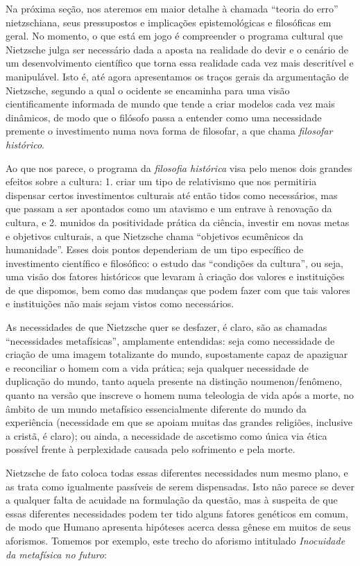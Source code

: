 \documentclass[
	12pt,				%
	openright,			%
	oneside,			%
	a4paper,			%
	english,			%
	french,				%
	spanish,			%
	brazil				%
	]{abntex2}
\begin{document}
	Na próxima seção, nos ateremos em maior detalhe à chamada “teoria do erro” nietzschiana, seus pressupostos e implicações epistemológicas e filosóficas em geral. No momento, o que está em jogo é compreender o programa cultural que Nietzsche julga ser necessário dada a aposta na realidade do devir e o cenário de um desenvolvimento científico que torna essa realidade cada vez mais descritível e manipulável. Isto é, até agora apresentamos os traços gerais da argumentação de Nietzsche, segundo a qual o ocidente se encaminha para uma visão cientificamente informada de mundo que tende a criar modelos cada vez mais dinâmicos, de modo que o filósofo passa a entender como uma necessidade premente o investimento numa nova forma de filosofar, a que chama \textit{filosofar histórico}.
	
	Ao que nos parece, o programa da \textit{filosofia histórica} visa pelo menos dois grandes efeitos sobre a cultura: 1. criar um tipo de relativismo que nos permitiria dispensar certos investimentos culturais até então tidos como necessários, mas que passam a ser apontados como um atavismo e um entrave à renovação da cultura, e 2. munidos da positividade prática da ciência, investir em novas metas e objetivos culturais, a que Nietzsche chama “objetivos ecumênicos da humanidade”. Esses dois pontos dependeriam de um tipo específico de investimento científico e filosófico: o estudo das “condições da cultura”, ou seja, uma visão dos fatores históricos que levaram à criação dos valores e instituições de que dispomos, bem como das mudanças que podem fazer com que tais valores e instituições não mais sejam vistos como necessários. 

As necessidades de que Nietzsche quer se desfazer, é claro, são as chamadas “necessidades metafísicas”, amplamente entendidas: seja como necessidade de criação de uma imagem totalizante do mundo, supostamente capaz de apaziguar e reconciliar o homem com a vida prática; seja qualquer necessidade de duplicação do mundo, tanto aquela presente na distinção noumenon/fenômeno, quanto na versão que inscreve o homem numa teleologia de vida após a morte, no âmbito de um mundo metafísico essencialmente diferente do mundo da experiência (necessidade em que se apoiam muitas das grandes religiões, inclusive a cristã, é claro); ou ainda, a necessidade de ascetismo como única via ética possível frente à perplexidade causada pelo sofrimento e pela morte.

	Nietzsche de fato coloca todas essas diferentes necessidades num mesmo plano, e as trata como igualmente passíveis de serem dispensadas. Isto não parece se dever a qualquer falta de acuidade na formulação da questão, mas à suspeita de que essas diferentes necessidades podem ter tido alguns fatores genéticos em comum, de modo que Humano apresenta hipóteses acerca dessa gênese em muitos de seus aforismos. Tomemos por exemplo, este trecho do aforismo intitulado \textit{Inocuidade da metafísica no futuro}:
	
\end{document}
